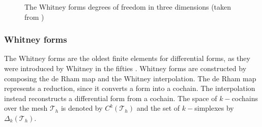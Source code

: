 \documentclass{elsarticle}
\begin{document}
\begin{figure}[tbh]%
\centering
{}%
\hspace{8pt}%
%
\hspace{8pt}%
	\hspace{8pt}%
\caption{The Whitney forms degrees of freedom in three dimensions (taken from \cite[Page 91]{arnold2018finite})}%
\label{fig:whitneyforms}%
\end{figure}

\subsubsection{Whitney forms}
The Whitney forms are the 
oldest finite elements for differential forms, as they were introduced by Whitney in the fifties \cite{whitney1957}. Whitney forms are constructed by composing the de Rham map and the Whitney interpolation. The de Rham map represents a reduction, since it converts a form into a cochain. The interpolation instead reconstructs a differential form from a cochain.  The space of $k-$cochains over the mesh $\mathcal{T}_h$ is denoted by $C^k(\mathcal{T}_h)$ and the set of $k-$simplexes by $\Delta_k(\mathcal{T}_h)$.
\end{document}
